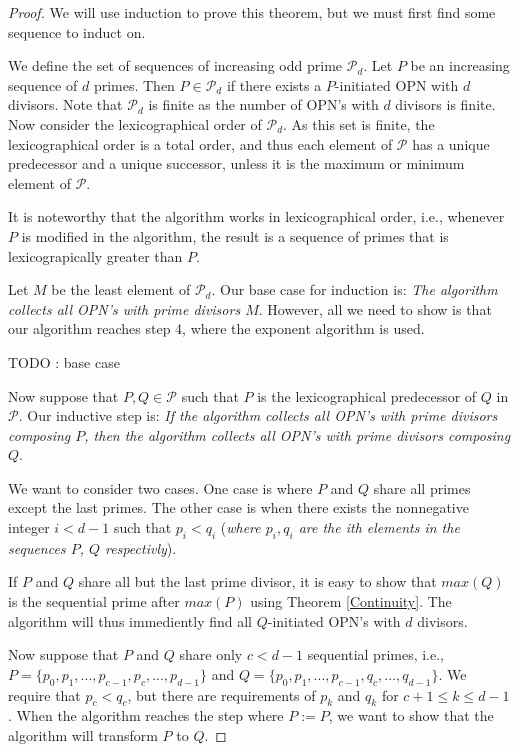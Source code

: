 \documentclass[../paper.tex]{subfiles}
\begin{document}
\begin{proof}
We will use induction to prove this theorem, but we must first
find some sequence to induct on.

We define the set of sequences of increasing odd prime $\mathcal{P}_d$.
Let $P$ be an increasing sequence of $d$ primes. Then $P \in
\mathcal{P}_d$ if there exists a $P$-initiated OPN with $d$
divisors. Note that $\mathcal{P}_d$ is finite as the number of OPN's
with $d$ divisors is finite\cite{dickson}. Now consider the
lexicographical order of $\mathcal{P}_d$. As this set is finite,
the lexicographical order is a total order, and thus each element
of $\mathcal{P}$ has a unique predecessor and a unique successor,
unless it is the maximum or minimum element of $\mathcal{P}$.

It is noteworthy that the algorithm works in lexicographical
order, i.e., whenever $P$ is modified in the algorithm, the result
is a sequence of primes that is lexicograpically greater than $P$.

Let $M$ be the least element of $\mathcal{P}_d$. Our base case
for induction is: \textit{The algorithm collects all OPN's with
prime divisors $M$}. However, all we need to show is that our algorithm
reaches step 4, where the exponent algorithm is used.

TODO : base case

Now suppose that $P, Q \in \mathcal{P}$ such that $P$ is the
lexicographical predecessor of $Q$ in $\mathcal{P}$. Our inductive
step is: \textit{If the algorithm collects all OPN's with prime
divisors composing $P$, then the algorithm collects all OPN's with
prime divisors composing $Q$}.

We want to consider two cases. One case is where $P$ and $Q$ share
all primes except the last primes. The other case is when there
exists the nonnegative integer $i < d - 1$ such that $p_i <
q_i$ (\textit{where $p_i, q_i$ are the ith elements in the
sequences $P$, $Q$ respectivly}).

If $P$ and $Q$ share all but the last prime divisor, it is easy to
show that $max(Q)$ is the sequential prime after $max(P)$ using
Theorem {\ref{Continuity}}. The algorithm will thus immediently
find all $Q$-initiated OPN's with $d$ divisors.

Now suppose that $P$ and $Q$ share only $c < d - 1$ sequential 
primes, i.e., $P = \{ p_0, p_1, ..., p_{c - 1}, p_c, ..., p_{d-1}\}$
and $Q = \{p_0, p_1, ..., p_{c - 1}, q_c, ..., q_{d - 1}\}$. We
require that $p_c < q_c$, but there are requirements of $p_k$
and $q_k$ for $c + 1 \leq k \leq d - 1$. When the algorithm
reaches the step where $P := P$, we want to show that the
algorithm will transform $P$ to $Q$. 


\end{proof}
\end{document}
